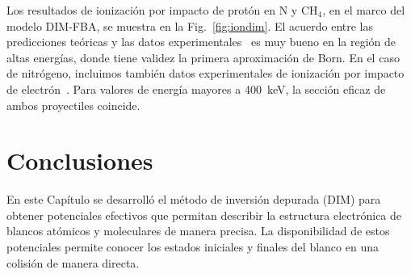 Los resultados de ionización por impacto de protón en N y CH$_4$, 
en el marco del modelo DIM-FBA, se muestra en la Fig.~\ref{fig:iondim}. 
El acuerdo entre las predicciones teóricas y las datos 
experimentales~\cite{Rudd:83,Rudd:85} es muy bueno en la región de altas 
energías, donde tiene validez la primera aproximación de Born. En el 
caso de nitrógeno, incluimos también datos experimentales de ionización 
por impacto de electrón~\cite{Brook:78}. Para valores de energía mayores 
a 400~keV, la sección eficaz de ambos proyectiles coincide. 

\section{Conclusiones}
\label{sec:conclusion-dim}

En este Capítulo se desarrolló el método de inversión depurada (DIM) 
para obtener potenciales efectivos que permitan describir la estructura 
electrónica de blancos atómicos y moleculares de manera precisa. La 
disponibilidad de estos potenciales permite conocer los estados 
iniciales y finales del blanco en una colisión de manera directa. 

